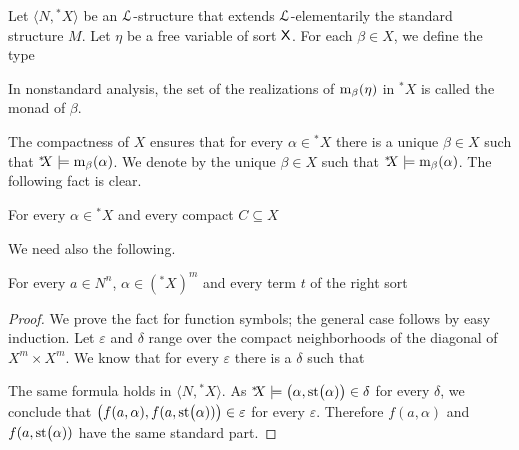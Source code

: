 \documentclass{amsproc}
\renewcommand*{\emph}[1]{%
   \smash{\tikz[baseline]\node[rectangle, fill=teal!25, rounded corners, inner xsep=0.5ex, inner ysep=0.2ex, anchor=base, minimum height = 2.7ex]{\strut #1};}}
\begin{document}
Let $\langle N, {}^*\!\!X\rangle$ be an ${\EuScript L}$-structure that extends ${\EuScript L}$-elementarily the standard structure $M$. %
Let $\eta$ be a free variable of sort ${\sf X}$.
For each $\beta\in X$, we define the type


In nonstandard analysis, the set of the realizations of ${\rm m}_\beta(\eta)$ in ${}^*\!\!X$ is called the monad of $\beta$. 

The compactness of $X$ ensures that for every $\alpha\in{}^*\!\!X$ there is a unique $\beta\in X$ such that ${}^*\!\!X\models{\rm m}_\beta(\alpha)$.
We denote by \emph{${\rm st}(\alpha)$\/} the unique $\beta\in X$ such that ${}^*\!\!X\models{\rm m}_\beta(\alpha)$.
The following fact is clear.

\begin{fact}\label{fact_st1}
  For every $\alpha\in{}^*\! X$ and every compact $C\subseteq X$

\end{fact}


We need also the following.

\begin{lemma}\label{fact_terms_st}
  For every $a\in N^n$, $\alpha\in({}^*\!\!X)^m$ and every term $t$ of the right sort

\end{lemma}

\begin{proof}
  We prove the fact for function symbols; the general case follows by easy induction.
  Let $\varepsilon$ and $\delta$ range over the compact neighborhoods of the diagonal of $X^m\times X^m$.
  We know that for every $\varepsilon$ there is a $\delta$ such that 
  
  
  The same formula holds in $\langle N,{}^*\!\!X\rangle$.
  As ${}^*\!\!X\models\big(\alpha,{\rm st}\big(\alpha)\big)\in\delta$ for every $\delta$, we conclude that $\big(f(a,\alpha),f(a,{\rm st}\big(\alpha))\big)\in\varepsilon$ for every $\varepsilon$.
  Therefore $f(a,\alpha)$ and $f(a,{\rm st}\big(\alpha))$ have the same standard part.
\end{proof}
\end{document}
